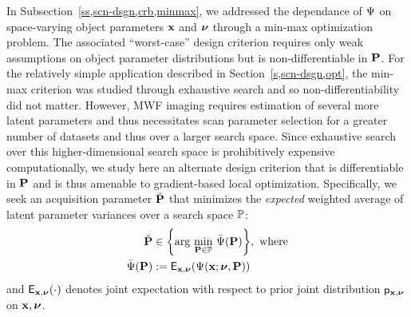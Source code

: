 In Subsection~\ref{ss,scn-dsgn,crb,minmax}, 
we addressed the dependance of $\Psi$ 
on space-varying object parameters $\mathbf{x}$ and $\boldsymbol{\nu}$
through a min-max optimization problem.
The associated ``worst-case'' design criterion 
requires only weak assumptions
on object parameter distributions
but is non-differentiable in $\mathbf{P}$.
For the relatively simple application described
in Section~\ref{s,scn-dsgn,opt},
the min-max criterion was studied 
through exhaustive search
and so non-differentiability did not matter.
However,
MWF imaging requires estimation
of several more latent parameters
and thus necessitates scan parameter selection
for a greater number of datasets
and thus over a larger search space.
Since exhaustive search 
over this higher-dimensional search space
is prohibitively expensive computationally,
we study here an alternate design criterion
that is differentiable in $\mathbf{P}$ 
and is thus amenable 
to gradient-based local optimization.
Specifically,
we seek an acquisition parameter $\breve{\mathbf{P}}$ 
that minimizes the \emph{expected} weighted average
of latent parameter variances
over a search space $\mathbb{P}$:
\begin{align}
	\bmPc &\in 
		\set{\argmin{\bmP \in \setP} \expcost\paren{\bmP}}, \where
		\label{eq:mwf,P-hat} \\
	\expcost\paren{\bmP} &:= 
		\expect{\bmx,\bmnu}{\costa{\bmx; \bmnu, \bmP}}
		\label{eq:mwf,expcost}
\end{align}
and $\expect{\bmx,\bmnu}{\cdot}$ denotes joint expectation
with respect to prior joint distribution $\mathsf{p}_{\mathbf{x},\boldsymbol{\nu}}$ on $\mathbf{x},\boldsymbol{\nu}$.

